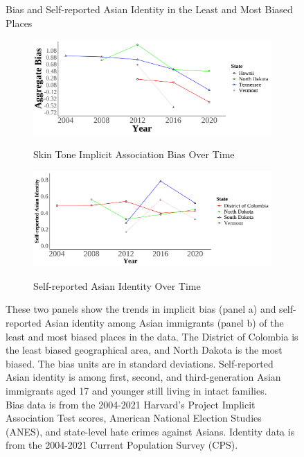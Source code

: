 
\begin{landscape}

\end{landscape}

\newpage
\pagebreak



\begin{center}
\begin{figure}[H]
\caption{Bias and Self-reported Asian Identity in the Least and Most Biased Places}

\begin{subfigure}{.9\textwidth}
\caption{Skin Tone Implicit Association Bias Over Time}
\centering
\includegraphics[width=.9\linewidth]{figure/Bias_twostates.png} 
\label{fig:skiniat}
\end{subfigure}
\begin{subfigure}{.9\textwidth}
\caption{Self-reported Asian Identity Over Time}
\centering
\includegraphics[width=.9\linewidth]{figure/Bias_twostates-asian.png} 
\label{fig:Asian-twostates}
\end{subfigure}
\caption*{\footnotesize{These two panels show the trends in implicit bias (panel a) and self-reported Asian identity among Asian immigrants (panel b) of the least and most biased places in the data. The District of Colombia is the least biased geographical area, and North Dakota is the most biased. The bias units are in standard deviations. Self-reported Asian identity is among first, second, and third-generation Asian immigrants aged 17 and younger still living in intact families.\\
Bias data is from the 2004-2021 Harvard's Project Implicit Association Test scores, American National Election Studies (ANES), and state-level hate crimes against Asians. Identity data is from the 2004-2021 Current Population Survey (CPS).}}
\end{figure}
\end{center}


